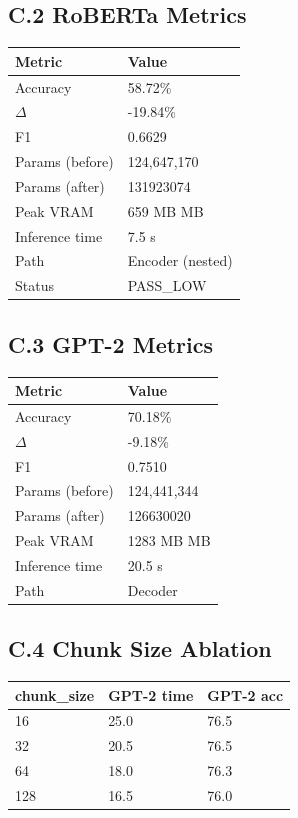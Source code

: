 \subsection{C.2 RoBERTa Metrics}

\begin{table}[H]
\centering
\small
\begin{tabular}{ll}
\toprule
\textbf{Metric} & \textbf{Value} \\
\midrule
Accuracy & 58.72\% \\
$\Delta$ & -19.84\% \\
F1 & 0.6629 \\
Params (before) & 124,647,170 \\
Params (after) & 131923074 \\
Peak VRAM & 659 MB MB \\
Inference time & 7.5 s \\
Path & Encoder (nested) \\
Status & PASS\_LOW \\
\bottomrule
\end{tabular}
\end{table}

\subsection{C.3 GPT-2 Metrics}

\begin{table}[H]
\centering
\small
\begin{tabular}{ll}
\toprule
\textbf{Metric} & \textbf{Value} \\
\midrule
Accuracy & 70.18\% \\
$\Delta$ & -9.18\% \\
F1 & 0.7510 \\
Params (before) & 124,441,344 \\
Params (after) & 126630020 \\
Peak VRAM & 1283 MB MB \\
Inference time & 20.5 s \\
Path & Decoder \\
\bottomrule
\end{tabular}
\end{table}

\subsection{C.4 Chunk Size Ablation}

\begin{table}[H]
\centering
\small
\begin{tabular}{lll}
\toprule
\textbf{chunk\_size} & \textbf{GPT-2 time} & \textbf{GPT-2 acc} \\
\midrule
16 & 25.0 & 76.5 \\
32 & 20.5 & 76.5 \\
64 & 18.0 & 76.3 \\
128 & 16.5 & 76.0 \\
\bottomrule
\end{tabular}
\end{table}

